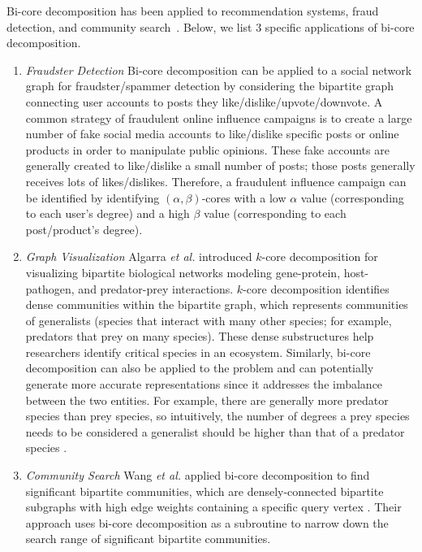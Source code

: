 Bi-core decomposition has been applied to recommendation systems, fraud detection, and community search~\cite{DingLi17,BeuXu13,WangZhang20}. Below, we list 3 specific applications of bi-core decomposition.

\begin{enumerate}
    \item \emph{Fraudster Detection}
    Bi-core decomposition can be applied to a social network graph for fraudster/spammer detection by considering the bipartite graph connecting user accounts to posts they like/dislike/upvote/downvote. A common strategy of fraudulent online influence campaigns is to create a large number of fake social media accounts to like/dislike specific posts or online products in order to manipulate public opinions. These fake accounts are generally created to like/dislike a small number of posts; those posts generally receives lots of likes/dislikes. Therefore, a fraudulent influence campaign can be identified by identifying $(\alpha,\beta)$-cores with a low $\alpha$ value (corresponding to each user's degree) and a high $\beta$ value (corresponding to each post/product's degree).
    \item \emph{Graph Visualization}
    Algarra \textit{et al.} introduced $k$-core decomposition for visualizing bipartite biological networks modeling gene-protein, host-pathogen, and predator-prey interactions. $k$-core decomposition identifies dense communities within the bipartite graph, which represents communities of generalists (species that interact with many other species; for example, predators that prey on many species). These dense substructures help researchers identify critical species in an ecosystem. Similarly, bi-core decomposition can also be applied to the problem and can potentially generate more accurate representations since it addresses the imbalance between the two entities. For example, there are generally more predator species than prey species, so intuitively, the number of degrees a prey species needs to be considered a generalist should be higher than that of a predator species \cite{CampbellBio}.
    \item \emph{Community Search}
    Wang \textit{et al.} applied bi-core decomposition to find significant bipartite communities, which are densely-connected bipartite subgraphs with high edge weights containing a specific query vertex \cite{WangZhang20}. Their approach uses bi-core decomposition as a subroutine to narrow down the search range of significant bipartite communities.
\end{enumerate}

